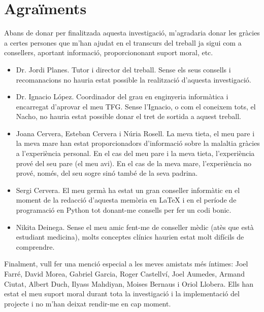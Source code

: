 \documentclass[a4paper,12pt]{article}
\begin{document}
\section*{Agraïments}
Abans de donar per finalitzada aquesta investigació, m'agradaria donar les gràcies a certes persones que m'han ajudat en el transcurs del treball ja sigui com a consellers, aportant informació, proporciononant suport moral, etc.
\begin{itemize}
    \item Dr. Jordi Planes. Tutor i director del treball. Sense els seus consells i recomanacions no hauria estat possible la realització d'aquesta investigació.
    \item  Dr. Ignacio López. Coordinador del grau en enginyeria informàtica i encarregat d'aprovar el meu TFG. Sense l'Ignacio, o com el coneixem tots, el Nacho, no hauria estat possible donar el tret de sortida a aquest treball.
    \item Joana Cervera, Esteban Cervera i Núria Rosell. La meva tieta, el meu pare i la meva mare han estat proporcionadors d'informació sobre la malaltia gràcies a l'experiència personal. En el cas del meu pare i la meva tieta, l'experiència prové del seu pare (el meu avi). En el cas de la meva mare, l'experiència no prové, només, del seu sogre sinó també de la seva padrina.
    \item Sergi Cervera. El meu germà ha estat un gran conseller informàtic en el moment de la redacció d'aquesta memòria en LaTeX i en el període de programació en Python tot donant-me consells per fer un codi bonic.
    \item Nikita Deinega. Sense el meu amic fent-me de conseller mèdic (atès que està estudiant medicina), molts conceptes clínics haurien estat molt difícils de comprendre.
\end{itemize}
Finalment, vull fer una menció especial a les meves amistats més íntimes: Joel Farré, David Morea, Gabriel Garcia, Roger Castellví, Joel Aumedes, Armand Ciutat, Albert Duch, Ilyass Mahdiyan, Moises Bernaus i Oriol Llobera. Ells han estat el meu suport moral durant tota la investigació i la implementació del projecte i no m'han deixat rendir-me en cap moment.
\end{document}
